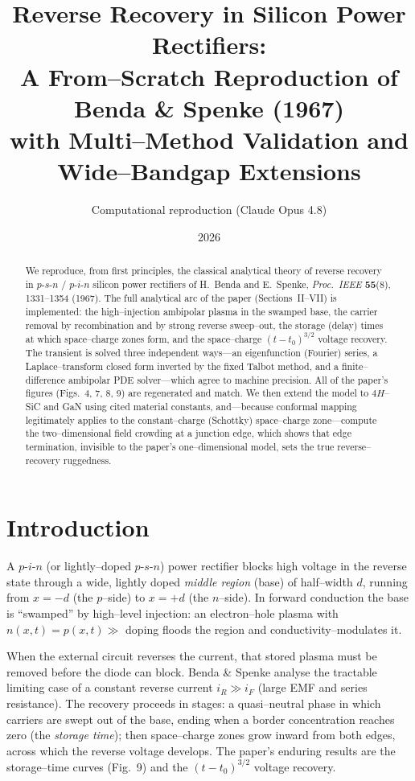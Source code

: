 \documentclass[11pt]{article}
\title{\textbf{Reverse Recovery in Silicon Power Rectifiers:\\
A From--Scratch Reproduction of Benda \& Spenke (1967)\\
with Multi--Method Validation and Wide--Bandgap Extensions}}
\author{Computational reproduction (Claude Opus 4.8)}
\date{2026}
\begin{document}
\maketitle

\begin{abstract}
\noindent
We reproduce, from first principles, the classical analytical theory of reverse
recovery in $p\text{-}s\text{-}n$ / $p\text{-}i\text{-}n$ silicon power
rectifiers of H.~Benda and E.~Spenke, \emph{Proc.\ IEEE} \textbf{55}(8),
1331--1354 (1967). The full analytical arc of the paper (Sections~II--VII) is
implemented: the high--injection ambipolar plasma in the swamped base, the
carrier removal by recombination and by strong reverse sweep--out, the storage
(delay) times at which space--charge zones form, and the space--charge
$(t-t_0)^{3/2}$ voltage recovery. The transient is solved three independent
ways---an eigenfunction (Fourier) series, a Laplace--transform closed form
inverted by the fixed Talbot method, and a finite--difference ambipolar PDE
solver---which agree to machine precision. All of the paper's figures
(Figs.~4, 7, 8, 9) are regenerated and match. We then extend the model to
$4H$--SiC and GaN using cited material constants, and---because conformal
mapping legitimately applies to the constant--charge (Schottky) space--charge
zone---compute the two--dimensional field crowding at a junction edge, which
shows that edge termination, invisible to the paper's one--dimensional model,
sets the true reverse--recovery ruggedness.
\end{abstract}

\tableofcontents
\bigskip

\section{Introduction}
A $p\text{-}i\text{-}n$ (or lightly--doped $p\text{-}s\text{-}n$) power rectifier
blocks high voltage in the reverse state through a wide, lightly doped
\emph{middle region} (base) of half--width $d$, running from $x=-d$ (the
$p$--side) to $x=+d$ (the $n$--side). In forward conduction the base is
``swamped'' by high--level injection: an electron--hole plasma with
$n(x,t)=p(x,t)\gg$ doping floods the region and conductivity--modulates it.

When the external circuit reverses the current, that stored plasma must be
removed before the diode can block. Benda \& Spenke analyse the tractable
limiting case of a constant reverse current $i_R \gg i_F$ (large EMF and series
resistance). The recovery proceeds in stages: a quasi--neutral phase in which
carriers are swept out of the base, ending when a border concentration reaches
zero (the \emph{storage time}); then space--charge zones grow inward from both
edges, across which the reverse voltage develops. The paper's enduring results
are the storage--time curves (Fig.~9) and the $(t-t_0)^{3/2}$ voltage recovery.
\end{document}
